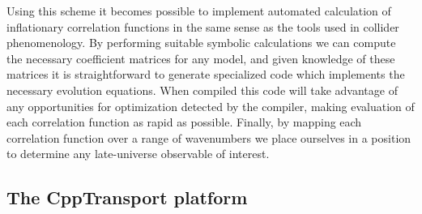 \documentclass[11pt,a4paper]{article}
\newcommand{\packagefont}{\sffamily}
\newcommand{\CppTransport}{{\packagefont CppTransport}}
\begin{document}
Using this scheme it becomes possible to implement automated
calculation of inflationary correlation functions in the same sense
as the tools used in collider phenomenology.
By performing suitable symbolic calculations we can
compute the necessary coefficient matrices for any model,
and given knowledge of these matrices it is straightforward to generate
specialized code which implements the necessary evolution equations.
When compiled this code will take advantage of any opportunities for
optimization detected by the compiler, making evaluation of
each correlation function as rapid as possible.
Finally, by
mapping each correlation function over a range of wavenumbers we
place ourselves in a position to determine any
late-universe observable of interest.

\subsection{The {\CppTransport} platform}
\end{document}
